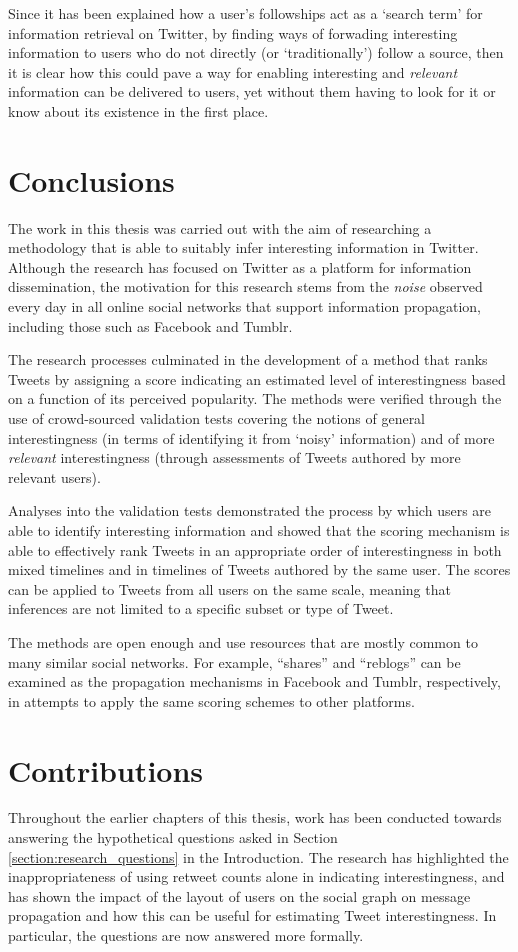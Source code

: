 Since it has been explained how a user's followships act as a `search term' for information retrieval on Twitter, by finding ways of forwading interesting information to users who do not directly (or `traditionally') follow a source, then it is clear how this could pave a way for enabling interesting and \textit{relevant} information can be delivered to users, yet without them having to look for it or know about its existence in the first place.


\section{Conclusions}
The work in this thesis was carried out with the aim of researching a methodology that is able to suitably infer interesting information in Twitter. Although the research has focused on Twitter as a platform for information dissemination, the motivation for this research stems from the \textit{noise} observed every day in all online social networks that support information propagation, including those such as Facebook and Tumblr.

The research processes culminated in the development of a method that ranks Tweets by assigning a score indicating an estimated level of interestingness based on a function of its perceived popularity. The methods were verified through the use of crowd-sourced validation tests covering the notions of general interestingness (in terms of identifying it from `noisy' information) and of more \textit{relevant} interestingness (through assessments of Tweets authored by more relevant users).

Analyses into the validation tests demonstrated the process by which users are able to identify interesting information and showed that the scoring mechanism is able to effectively rank Tweets in an appropriate order of interestingness in both mixed timelines and in timelines of Tweets authored by the same user. The scores can be applied to Tweets from all users on the same scale, meaning that inferences are not limited to a specific subset or type of Tweet.

The methods are open enough and use resources that are mostly common to many similar social networks. For example, ``shares'' and ``reblogs'' can be examined as the propagation mechanisms in Facebook and Tumblr, respectively, in attempts to apply the same scoring schemes to other platforms.


\section{Contributions}
Throughout the earlier chapters of this thesis, work has been conducted towards answering the hypothetical questions asked in Section \ref{section:research_questions} in the Introduction. The research has highlighted the inappropriateness of using retweet counts alone in indicating interestingness, and has shown the impact of the layout of users on the social graph on message propagation and how this can be useful for estimating Tweet interestingness. In particular, the questions are now answered more formally.

